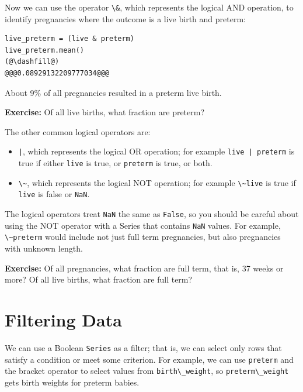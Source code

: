 Now we can use the operator \passthrough{\lstinline!\&!}, which
represents the logical AND operation, to identify pregnancies where the
outcome is a live birth and preterm:

\begin{lstlisting}[]
live_preterm = (live & preterm)
live_preterm.mean()
(@\dashfill@)
@@@0.08929132209777034@@@
\end{lstlisting}

About 9\% of all pregnancies resulted in a preterm live birth.

\textbf{Exercise:} Of all live births, what fraction are preterm?

The other common logical operators are:

\begin{itemize}
\item
  \passthrough{\lstinline!|!}, which represents the logical OR
  operation; for example \passthrough{\lstinline!live | preterm!} is
  true if either \passthrough{\lstinline!live!} is true, or
  \passthrough{\lstinline!preterm!} is true, or both.
\item
  \passthrough{\lstinline!\~!}, which represents the logical NOT
  operation; for example \passthrough{\lstinline!\~live!} is true if
  \passthrough{\lstinline!live!} is false or
  \passthrough{\lstinline!NaN!}.
\end{itemize}

The logical operators treat \passthrough{\lstinline!NaN!} the same as
\passthrough{\lstinline!False!}, so you should be careful about using
the NOT operator with a Series that contains
\passthrough{\lstinline!NaN!} values. For example,
\passthrough{\lstinline!\~preterm!} would include not just full term
pregnancies, but also pregnancies with unknown length.

\textbf{Exercise:} Of all pregnancies, what fraction are full term, that
is, 37 weeks or more? Of all live births, what fraction are full term?

\hypertarget{filtering-data}{%
\section{Filtering Data}\label{filtering-data}}

We can use a Boolean \passthrough{\lstinline!Series!} as a filter; that
is, we can select only rows that satisfy a condition or meet some
criterion. For example, we can use \passthrough{\lstinline!preterm!} and
the bracket operator to select values from
\passthrough{\lstinline!birth\_weight!}, so
\passthrough{\lstinline!preterm\_weight!} gets birth weights for preterm
babies.

